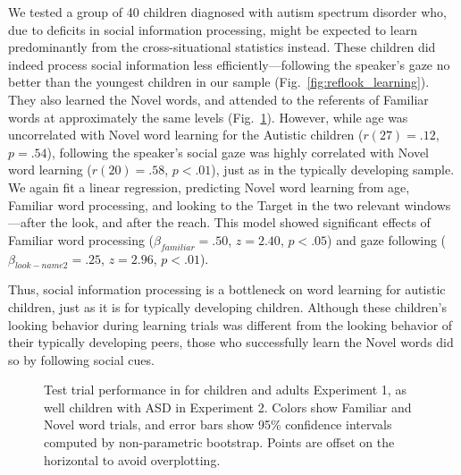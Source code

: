 \documentclass{pnastwo}
\begin{document}
\begin{article}
We tested a group of 40 children diagnosed with autism spectrum disorder who, due to deficits in social information processing, might be expected to learn predominantly from the cross-situational statistics instead. These children did indeed process social information less efficiently---following the speaker's gaze no better than the youngest children in our sample (Fig.~\ref{fig:reflook_learning}). They also learned the Novel words, and attended to the referents of Familiar words at approximately the same levels (Fig.~\ref{fig:reflook_test}). However, while age was uncorrelated with Novel word learning for the Autistic children ($r(27) = .12$, $p =.54$), following the speaker's social gaze was highly correlated with Novel word learning ($r(20) = .58$, $p <.01$), just as in the typically developing sample. We again fit a linear regression, predicting Novel word learning from age, Familiar word processing, and looking to the Target in the two relevant windows---after the look, and after the reach. This model showed significant effects of Familiar word processing ($\beta_{familiar} = .50$, $z = 2.40$, $p < . 05$) and gaze following  ($\beta_{look-name2} = .25$, $z = 2.96$, $p < .01$).

Thus, social information processing is a bottleneck on word learning for autistic children, just as it is for typically developing children. Although these children's looking behavior during learning trials was different from the looking behavior of their typically developing peers, those who successfully learn the Novel words did so by following social cues.

\begin{figure}[tb]
	\caption{Test trial performance in for children and adults Experiment 1, as well children with ASD in Experiment 2. Colors show Familiar and Novel word trials, and error bars show 95\% confidence intervals computed by non-parametric bootstrap. Points are offset on the horizontal to avoid overplotting.}
	\label{fig:reflook_test}
\end{figure}


\end{article}
\end{document}
